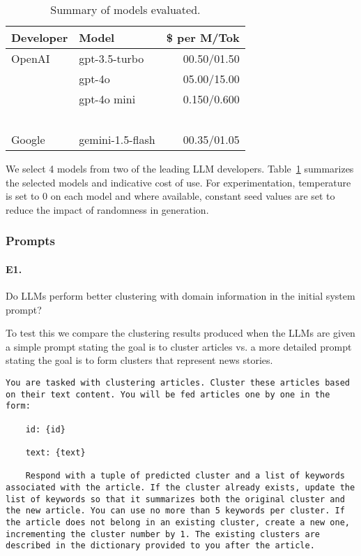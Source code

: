 \begin{table}[ht!]
    \centering
    \begin{tabular}{l|lr}
        \textbf{Developer} & \textbf{Model} & \textbf{\$ per M/Tok} \\
        \hline
        OpenAI  & gpt-3.5-turbo     & 00.50/01.50 \\
        ~       & gpt-4o             & 05.00/15.00 \\
        ~       & gpt-4o mini       & 0.150/0.600 \\
        ~       & ~                 & ~     \\
        Google  & gemini-1.5-flash  & 00.35/01.05 \\
    \end{tabular}
    \caption{Summary of models evaluated.}
    \label{tab:models}
\end{table}

We select 4 models from two of the leading LLM developers. 
Table~\ref{tab:models} summarizes the selected models and indicative cost of use. 
For experimentation, temperature is set to $0$ on each model and where available, constant seed values are set to reduce the impact of randomness in generation.


\subsubsection{Prompts}

\paragraph{\textbf{E1.}}
Do LLMs perform better clustering with domain information in the initial system prompt?

\noindent To test this we compare the clustering results produced when the LLMs are given a simple prompt stating the goal is to cluster articles vs. a more detailed prompt stating the goal is to form clusters that represent news stories.

\begin{lstlisting}[title=Prompt 1: Generic Initial System Prompt]
    You are tasked with clustering articles. Cluster these articles based on their text content. You will be fed articles one by one in the form:

    id: {id}
    
    text: {text}
    
    Respond with a tuple of predicted cluster and a list of keywords associated with the article. If the cluster already exists, update the list of keywords so that it summarizes both the original cluster and the new article. You can use no more than 5 keywords per cluster. If the article does not belong in an existing cluster, create a new one, incrementing the cluster number by 1. The existing clusters are described in the dictionary provided to you after the article.
\end{lstlisting}


